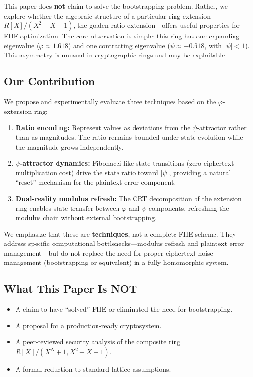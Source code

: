 \documentclass[11pt,a4paper]{article}
\begin{document}
This paper does \textbf{not} claim to solve the bootstrapping problem. Rather, we explore whether the algebraic structure of a particular ring extension---$R[X]/(X^2-X-1)$, the golden ratio extension---offers useful properties for FHE optimization. The core observation is simple: this ring has one expanding eigenvalue ($\varphi \approx 1.618$) and one contracting eigenvalue ($\psi \approx -0.618$, with $|\psi| < 1$). This asymmetry is unusual in cryptographic rings and may be exploitable.

\subsection{Our Contribution}

We propose and experimentally evaluate three techniques based on the $\varphi$-extension ring:

\begin{enumerate}
    \item \textbf{Ratio encoding:} Represent values as deviations from the $\psi$-attractor rather than as magnitudes. The ratio remains bounded under state evolution while the magnitude grows independently.
    \item \textbf{$\psi$-attractor dynamics:} Fibonacci-like state transitions (zero ciphertext multiplication cost) drive the state ratio toward $|\psi|$, providing a natural ``reset'' mechanism for the plaintext error component.
    \item \textbf{Dual-reality modulus refresh:} The CRT decomposition of the extension ring enables state transfer between $\varphi$ and $\psi$ components, refreshing the modulus chain without external bootstrapping.
\end{enumerate}

We emphasize that these are \textbf{techniques}, not a complete FHE scheme. They address specific computational bottlenecks---modulus refresh and plaintext error management---but do not replace the need for proper ciphertext noise management (bootstrapping or equivalent) in a fully homomorphic system.

\subsection{What This Paper Is NOT}

\begin{itemize}
    \item A claim to have ``solved'' FHE or eliminated the need for bootstrapping.
    \item A proposal for a production-ready cryptosystem.
    \item A peer-reviewed security analysis of the composite ring $R[X]/(X^N+1, X^2-X-1)$.
    \item A formal reduction to standard lattice assumptions.
\end{itemize}
\end{document}
